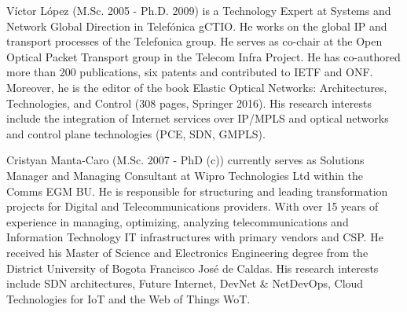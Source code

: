 \documentclass[10pt, conference]{IEEEtran}
\begin{document}
\begin{IEEEbiography}%
{Víctor López} (M.Sc. 2005 - Ph.D. 2009) is a Technology Expert at Systems and Network Global Direction in Telefónica gCTIO. He works on the global IP and transport processes of the Telefonica group. He serves as co-chair at the Open Optical Packet Transport group in the Telecom Infra Project. He has co-authored more than 200 publications, six patents and contributed to IETF and ONF. Moreover, he is the editor of the book Elastic Optical Networks: Architectures, Technologies, and Control (308 pages, Springer 2016). His research interests include the integration of Internet services over IP/MPLS and optical networks and control plane technologies (PCE, SDN, GMPLS).\end{IEEEbiography}

\begin{IEEEbiography}%
{Cristyan Manta-Caro} (M.Sc. 2007 - PhD (c)) currently serves as Solutions Manager and Managing Consultant at Wipro Technologies Ltd within the Comms EGM BU. He is responsible for structuring and leading transformation projects for Digital and Telecommunications providers. With over 15 years of experience in managing, optimizing, analyzing telecommunications and Information Technology IT infrastructures with primary vendors and CSP. He received his Master of Science and Electronics Engineering degree from the District University of Bogota Francisco Jos\'e de Caldas. His research interests include SDN architectures, Future Internet, DevNet \& NetDevOps, Cloud Technologies for IoT and the Web of Things WoT.\end{IEEEbiography}
\end{document}
